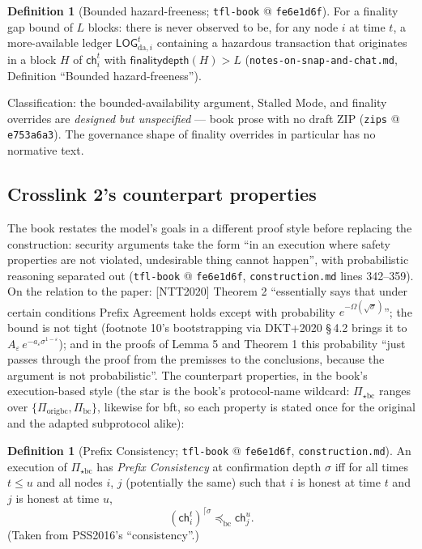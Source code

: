 \documentclass[11pt,a4paper]{article}
\theoremstyle{definition}
\newtheorem{definition}[theorem]{Definition}
\begin{document}
\begin{definition}[Bounded hazard-freeness; \texttt{tfl-book} @
\texttt{fe6e1d6f}]
\label{def:xl-bounded-hazard}
For a finality gap bound of $L$ blocks: there is never observed to be,
for any node $i$ at time $t$, a more-available ledger
$\mathsf{LOG}_{\mathrm{da},i}^t$ containing a hazardous transaction that
originates in a block $H$ of $\mathsf{ch}_i^t$ with
$\mathsf{finalitydepth}(H) > L$
(\texttt{notes-on-snap-and-chat.md}, Definition ``Bounded
hazard-freeness'').
\end{definition}

Classification: the bounded-availability argument, Stalled Mode, and
finality overrides are \emph{designed but unspecified} --- book prose with
no draft ZIP (\texttt{zips} @ \texttt{e753a6a3}). The governance shape of
finality overrides in particular has no normative text.

\subsection{Crosslink 2's counterpart properties}
\label{sec:xl-counterparts}

The book restates the model's goals in a different proof style before
replacing the construction: security arguments take the form ``in an
execution where safety properties are not violated, undesirable thing
cannot happen'', with probabilistic reasoning separated out
(\texttt{tfl-book} @ \texttt{fe6e1d6f}, \texttt{construction.md} lines
342--359). On the relation to the paper: [NTT2020] Theorem 2
``essentially says that under certain conditions Prefix Agreement holds
except with probability $e^{-\Omega(\sqrt{\sigma})}$''; the bound is not
tight (footnote 10's bootstrapping via DKT+2020 \S\,4.2 brings it to
$A_\varepsilon\, e^{-a_\varepsilon \sigma^{1-\varepsilon}}$); and in the
proofs of Lemma 5 and Theorem 1 this probability ``just passes through
the proof from the premisses to the conclusions, because the argument is
not probabilistic''. The counterpart properties, in the book's
execution-based style (the star is the book's protocol-name wildcard:
$\Pi_{\star\mathrm{bc}}$ ranges over
$\{\Pi_{\mathrm{origbc}}, \Pi_{\mathrm{bc}}\}$, likewise for bft, so
each property is stated once for the original and the adapted
subprotocol alike):

\begin{definition}[Prefix Consistency; \texttt{tfl-book} @
\texttt{fe6e1d6f}, \texttt{construction.md}]\label{def:xl-prefix-consistency-ntt}
An execution of $\Pi_{\star\mathrm{bc}}$ has \emph{Prefix Consistency}
at confirmation depth $\sigma$ iff for all times $t \le u$ and all nodes
$i$, $j$ (potentially the same) such that $i$ is honest at time $t$ and
$j$ is honest at time $u$,
\[
(\mathsf{ch}_i^t)^{\lceil\sigma} \preceq_{\mathrm{bc}} \mathsf{ch}_j^u.
\]
(Taken from PSS2016's ``consistency''.)
\end{definition}
\end{document}
